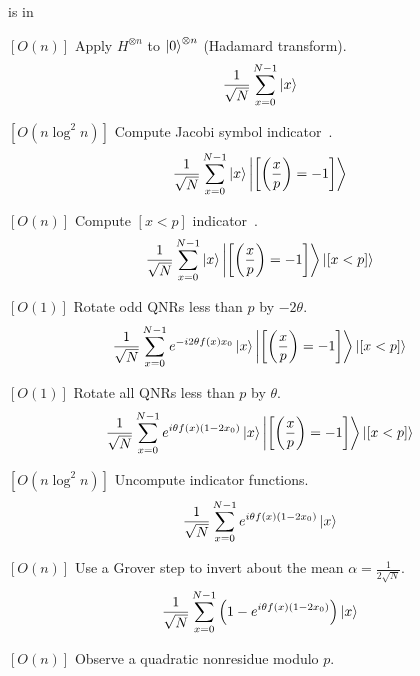 \documentclass[final]{beamer}
\providecommand{\QNR}{\csword{QNR}}
\newlength{\colwidth}
\begin{document}
\begin{frame}[t]
\begin{columns}[t]
\begin{column}{\colwidth}
\begin{exampleblock}{\QNR is in \EQPC}
\begin{algorithm}
  \caption{
    Given $p\equiv 1 \bmod 8$, 
  choose least $n$ where $p<2^n=N$. 
    Let $\theta=\mbox{arccos}\left(1-\frac{2^n}{p-1}\right)$, and
    $f(x)=\left[\jacobi{x}{p}=-1\text{ and } 0\le x<p\right]$.
}
  \label{quantum_qnr}
  \begin{noindqlist}
  \item $[O(n)]$ Apply $H^{\otimes n}$ to \( \left| 0 \right\rangle^{\otimes n} \) (Hadamard transform).
    \[ \frac{1}{\sqrt{N}}\sum_{x=0}^{N-1} \left| x \right\rangle \]
  \item $[O(n\log^2 n)]$ Compute Jacobi symbol indicator~\cite{harvey:hal-02070778,DBLP:journals/corr/abs-1004-2091}.
\[\frac{1}{\sqrt{N}} \sum_{x=0}^{N-1} \left| x \right\rangle\left| \left[\left( \displaystyle\frac{x}{p} \right)=-1\right] \right\rangle\]
\item $[O(n)]$ Compute $[x<p]$ indicator~\cite{comparator}.
\[\frac{1}{\sqrt{N}} \sum_{x=0}^{N-1} \left| x \right\rangle\left| \left[\left( \displaystyle\frac{x}{p} \right)=-1\right] \right\rangle\left| [x<p] \right\rangle\]
  \item $[O(1)]$ Rotate odd QNRs less than $p$ by $-2\theta$.
  \[\frac{1}{\sqrt{N}} \sum_{x=0}^{N-1} e^{-i2\theta f(x)x_0}\left| x \right\rangle\left| \left[\left( \displaystyle\frac{x}{p} \right)=-1\right] \right\rangle\left| [x<p] \right\rangle\]
\item $[O(1)]$ Rotate all QNRs less than $p$ by $\theta$.
  \[\frac{1}{\sqrt{N}} \sum_{x=0}^{N-1} e^{i\theta f(x)(1-2x_0)}\left| x \right\rangle\left| \left[\left( \displaystyle\frac{x}{p} \right)=-1\right] \right\rangle\left| [x<p] \right\rangle\]
\item $[O(n\log^2 n)]$ Uncompute indicator functions.
  \[\frac{1}{\sqrt{N}} \sum_{x=0}^{N-1} e^{i\theta f(x)(1-2x_0)}\left| x \right\rangle\]
\item $[O(n)]$ Use a Grover step to invert about the mean $\alpha=\frac{1}{2\sqrt{N}}$.
    \[ \frac{1}{\sqrt N}\sum_{x=0}^{N-1} \left(1-e^{i\theta f(x) (1-2x_0)}\right)\left| x \right\rangle \]
  \item $[O(n)]$ Observe a quadratic nonresidue modulo $p$.
  \end{noindqlist}
\end{algorithm}


\end{exampleblock}
\end{column}
\end{columns}
\end{frame}
\end{document}
